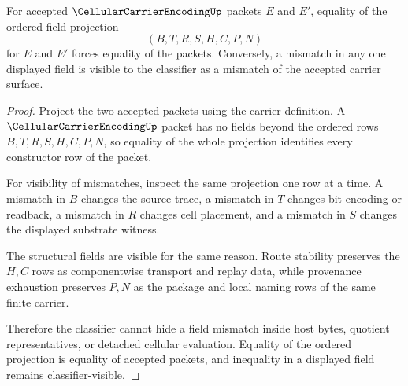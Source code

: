 \begin{theorem}
\label{thm:cellular-carrier-encoding-field-projection-faithfulness}
For accepted $\CellularCarrierEncodingUp$ packets $E$ and $E'$, equality of the ordered field projection
$$
(B,T,R,S,H,C,P,N)
$$
for $E$ and $E'$ forces equality of the packets. Conversely, a mismatch in any one displayed field is visible to the classifier as a mismatch of the accepted carrier surface.
\end{theorem}
\begin{proof}
Project the two accepted packets using the carrier definition. A $\CellularCarrierEncodingUp$ packet has no fields beyond the ordered rows $B,T,R,S,H,C,P,N$, so equality of the whole projection identifies every constructor row of the packet.

For visibility of mismatches, inspect the same projection one row at a time. A mismatch in $B$ changes the source trace, a mismatch in $T$ changes bit encoding or readback, a mismatch in $R$ changes cell placement, and a mismatch in $S$ changes the displayed substrate witness.

The structural fields are visible for the same reason. Route stability preserves the $H,C$ rows as componentwise transport and replay data, while provenance exhaustion preserves $P,N$ as the package and local naming rows of the same finite carrier.

Therefore the classifier cannot hide a field mismatch inside host bytes, quotient representatives, or detached cellular evaluation. Equality of the ordered projection is equality of accepted packets, and inequality in a displayed field remains classifier-visible.
\end{proof}

